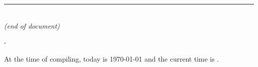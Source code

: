 
 \makeatletter 
  \if@twocolumn
    \tiny
      \fi
\makeatother

   \begin{singlespace}
         \begin{center}
           \rule[0 pt]{\linewidth}{0.5pt}\\	
             \textit{(end of document)}\\
      \vspace*{\fill}
%
%
\begin{changemargin}{-\marginparwidth}%
{%
\begin{center}
At the time of compiling, today is \longusdate\today{} and the current time is \currenttime{} 
% 
\timezone.%
\end{center}
}
\end{changemargin}
\end{center}
\end{singlespace}
